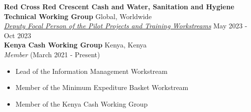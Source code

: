 \documentclass[line,margin,10pt]{res}
\begin{document}
\begin{resume}
\textbf{Red Cross Red Crescent Cash and Water, Sanitation and Hygiene Technical Working Group} \hfill Global, Worldwide\\
{\sl \href{https://sites.google.com/view/twgcashandwash/about-twg/membership#h.2r4pyiwuqh4k}{Deputy Focal Person of the Pilot Projects and Training Workstreams}} \hfill  May 2023 - Oct 2023 \\

\textbf{Kenya Cash Working Group} \hfill Kenya, Kenya\\
{\sl Member} \hfill (March 2021 - Present)
\begin{itemize} \itemsep -2pt
    \item Lead of the Information Management Workstream
    \item Member of the Minimum Expediture Basket Workstream
    \item Member of the Kenya Cash Working Group
\end{itemize}
{\vspace{-0.25cm}}


\end{resume}
\end{document}
